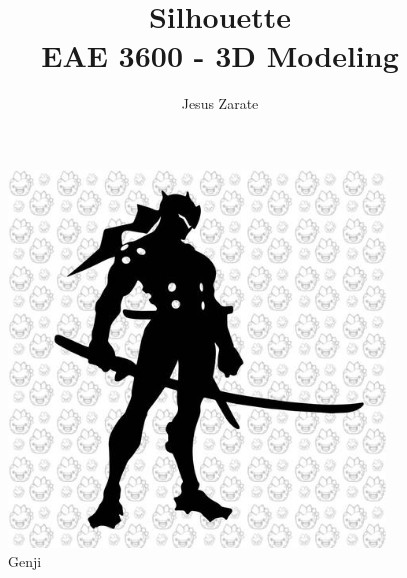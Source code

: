 \documentclass[a4paper]{article}
\title{
  Silhouette\\
  \large EAE 3600 - 3D Modeling}
\author{Jesus Zarate}
\begin{document}
\maketitle

\begin{figure}[h]
\centering
\includegraphics[width=10cm]{img/GENJI.jpg}
\caption{Genji}
\label{fig:Gengi}
\end{figure}
\end{document}
